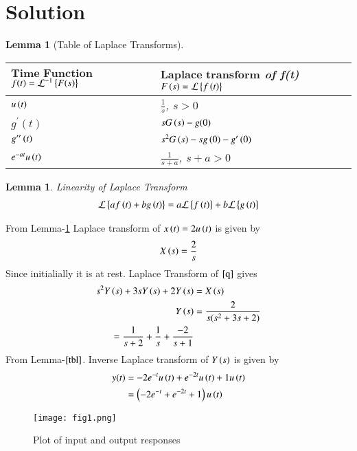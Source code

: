 \documentclass[journal,12pt,twocolumn]{IEEEtran}
\newtheorem{lemma}[theorem]{Lemma}
\begin{document}
\section{Solution}
\begin{lemma}[Table of Laplace Transforms]\label{tbl}
\begin{center}
\begin{tabular}{ |m{3cm}|m{4.5cm}| } 
 \hline
 $\textbf{Time Function}$ $f(t)=\mathcal{L}^{-1}\left\{F(s)\right\}$ & $\textbf{Laplace transform}$ of f(t) $F\left(s\right)=\mathcal{L}\left\{f\left(t\right)\right\}$ \\ 
 \hline
 $u\left(t\right)$ & $\frac{1}{s}$, $s>0$ \\ 
 \hline
 $g^{\prime}(t)$ & $sG\left(s\right)-g(0)$ \\ 
 \hline
 $g^{\prime\prime}\left(t\right)$ & $s^2G\left(s\right)-sg\left(0\right)-g^{\prime}\left(0\right)$\\
 \hline
 $e^{-at}u\left(t\right)$ & $\frac{1}{s+a}$, $s+a>0$\\
 \hline
\end{tabular}
\end{center}
\end{lemma}
\begin{lemma}{Linearity of Laplace Transform}
\begin{align}
    \mathcal{L}\left\{af\left(t\right)+bg\left(t\right)\right\}=a\mathcal{L}\left\{f\left(t\right)\right\}+b\mathcal{L}\left\{g\left(t\right)\right\}
\end{align}
\end{lemma}
From Lemma-\ref{tbl} Laplace transform of $x\left(t\right)=2u\left(t\right)$ is given by
\begin{align}
    X\left(s\right)=\frac{2}{s}
\end{align}
Since initialially it is at rest. Laplace Transform of $\eqref{q}$ gives
\begin{align}
    s^{2}Y\left(s\right)+3sY\left(s\right)+2Y\left(s\right)&=X\left(s\right)\\
    Y\left(s\right)&=\frac{2}{s(s^2+3s+2)}\\
    = \frac{1}{s+2}+\frac{1}{s}+ \frac{-2}{s+1}\label{hc}\\
\end{align}
From Lemma-$\ref{tbl}$. Inverse Laplace transform of $Y\left(s\right)$ is given by
\begin{align}
    y(t)&=-2e^{-t}u\left(t\right)+e^{-2t}u\left(t\right)+1 u\left(t\right)\\
    &=\left(-2e^{-t}+e^{-2t}+1\right)u\left(t\right)
\end{align}
\begin{figure}[htp]
    \centering
    \texttt{[image: fig1.png]}
    \caption{Plot of input and output responses }
    \label{fig:my_label}
\end{figure}
\end{document}
